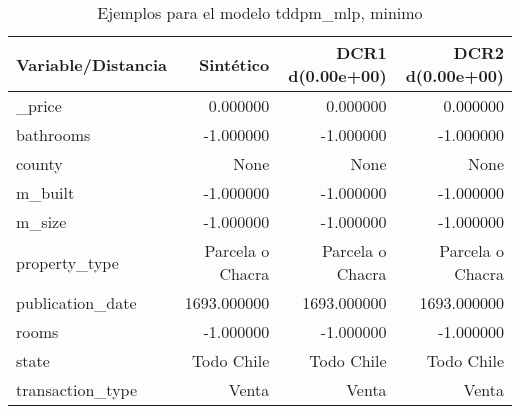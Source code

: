 \begin{table}[H]
\centering
\fontsize{10}{14}\selectfont
\caption{Ejemplos para el modelo tddpm\_mlp, minimo}
\label{table-example-economicos-b-1-tddpm_mlp-min}
\begin{tabular}{|l|r|r|r|}
\hline
\rowcolor[gray]{0.8}
Variable/Distancia & Sintético & DCR1 d(0.00e+00) & DCR2 d(0.00e+00) \\
\hline \_price & \cellcolor[rgb]{0.9, 0.54, 0.52} 0.000000 & \cellcolor[rgb]{0.9, 0.54, 0.52} 0.000000 & \cellcolor[rgb]{0.9, 0.54, 0.52} 0.000000 \\
\hline bathrooms & \cellcolor[rgb]{0.9, 0.54, 0.52} -1.000000 & \cellcolor[rgb]{0.9, 0.54, 0.52} -1.000000 & \cellcolor[rgb]{0.9, 0.54, 0.52} -1.000000 \\
\hline county & \cellcolor[rgb]{0.9, 0.54, 0.52} None & \cellcolor[rgb]{0.9, 0.54, 0.52} None & \cellcolor[rgb]{0.9, 0.54, 0.52} None \\
\hline m\_built & \cellcolor[rgb]{0.9, 0.54, 0.52} -1.000000 & \cellcolor[rgb]{0.9, 0.54, 0.52} -1.000000 & \cellcolor[rgb]{0.9, 0.54, 0.52} -1.000000 \\
\hline m\_size & \cellcolor[rgb]{0.9, 0.54, 0.52} -1.000000 & \cellcolor[rgb]{0.9, 0.54, 0.52} -1.000000 & \cellcolor[rgb]{0.9, 0.54, 0.52} -1.000000 \\
\hline property\_type & \cellcolor[rgb]{0.9, 0.54, 0.52} Parcela o Chacra & \cellcolor[rgb]{0.9, 0.54, 0.52} Parcela o Chacra & \cellcolor[rgb]{0.9, 0.54, 0.52} Parcela o Chacra \\
\hline publication\_date & \cellcolor[rgb]{0.9, 0.54, 0.52} 1693.000000 & \cellcolor[rgb]{0.9, 0.54, 0.52} 1693.000000 & \cellcolor[rgb]{0.9, 0.54, 0.52} 1693.000000 \\
\hline rooms & \cellcolor[rgb]{0.9, 0.54, 0.52} -1.000000 & \cellcolor[rgb]{0.9, 0.54, 0.52} -1.000000 & \cellcolor[rgb]{0.9, 0.54, 0.52} -1.000000 \\
\hline state & \cellcolor[rgb]{0.9, 0.54, 0.52} Todo Chile & \cellcolor[rgb]{0.9, 0.54, 0.52} Todo Chile & \cellcolor[rgb]{0.9, 0.54, 0.52} Todo Chile \\
\hline transaction\_type & \cellcolor[rgb]{0.9, 0.54, 0.52} Venta & \cellcolor[rgb]{0.9, 0.54, 0.52} Venta & \cellcolor[rgb]{0.9, 0.54, 0.52} Venta \\
\hline
\end{tabular}
\end{table}
